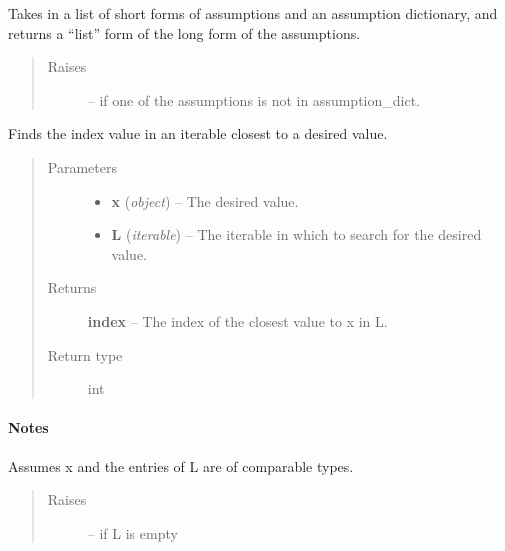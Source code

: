 \documentclass[letterpaper,10pt,english]{sphinxmanual}
\begin{document}

\begin{fulllineitems}
\label{atmos:atmos.util.assumption_list_string}
Takes in a list of short forms of assumptions and an assumption
dictionary, and returns a ``list'' form of the long form of the
assumptions.
\begin{quote}\begin{description}
\item[{Raises}] \leavevmode
{} --
if one of the assumptions is not in assumption\_dict.

\end{description}\end{quote}

\end{fulllineitems}


\begin{fulllineitems}
\label{atmos:atmos.util.closest_val}
Finds the index value in an iterable closest to a desired value.
\begin{quote}\begin{description}
\item[{Parameters}] \leavevmode\begin{itemize}
\item {} 
\textbf{x} (\emph{object}) -- The desired value.

\item {} 
\textbf{L} (\emph{iterable}) -- The iterable in which to search for the desired value.

\end{itemize}

\item[{Returns}] \leavevmode
\textbf{index} --
The index of the closest value to x in L.

\item[{Return type}] \leavevmode
int

\end{description}\end{quote}
\paragraph{Notes}

Assumes x and the entries of L are of comparable types.
\begin{quote}\begin{description}
\item[{Raises}] \leavevmode
{} --
if L is empty

\end{description}\end{quote}

\end{fulllineitems}
\end{document}
